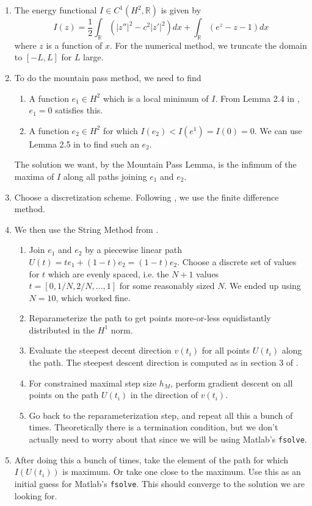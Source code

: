 \documentclass[12pt]{article}
\def\R{{\mathbb R}}
\begin{document}
\begin{enumerate}
	\item The energy functional $I \in C^1(H^2, \R)$ is given by
	\begin{equation}
	I(z) = \frac{1}{2} \int_\R (|z''|^2 - c^2 |z'|^2)dx 
	+ \int_\R (e^z - z - 1) dx
	\end{equation}
	where $z$ is a function of $x$. For the numerical method, we truncate the domain to $[-L, L]$ for $L$ large.
	\item To do the mountain pass method, we need to find
	\begin{enumerate}
		\item A function $e_1 \in H^2$ which is a local minimum of $I$. From Lemma 2.4 in \cite{Chen1997}, $e_1 = 0$ satisfies this.
		\item A function $e_2 \in H^2$ for which $I(e_2) < I(e^1) = I(0) = 0$. We can use Lemma 2.5 in \cite{Chen1997} to find such an $e_2$. 
	\end{enumerate} 
	The solution we want, by the Mountain Pass Lemma, is the infimum of the maxima of $I$ along all paths joining $e_1$ and $e_2$.
	\item Choose a discretization scheme. Following \cite{Chen1997}, we use the finite difference method.
	\item We then use the String Method from \cite{Chamard2011}.
	\begin{enumerate}
		\item Join $e_1$ and $e_2$ by a piecewise linear path $U(t) = t e_1 + (1-t) e_2 = (1-t)e_2$. Choose a discrete set of values for $t$ which are evenly spaced, i.e. the $N+1$ values $t = [0, 1/N, 2/N, ..., 1]$ for some reasonably sized $N$. We ended up using $N = 10$, which worked fine.
		\item Reparameterize the path to get points more-or-less equidistantly distributed in the $H^1$ norm.
		\item Evaluate the steepest decent direction $v(t_i)$ for all points $U(t_i)$ along the path. The steepest descent direction is computed as in section 3 of \cite{Chen1997}.
		\item For constrained maximal step size $h_M$, perform gradient descent on all points on the path $U(t_i)$ in the direction of $v(t_i)$.
		\item Go back to the reparameterization step, and repeat all this a bunch of times. Theoretically there is a termination condition, but we don't actually need to worry about that since we will be using Matlab's \texttt{fsolve}.
	\end{enumerate}
	\item After doing this a bunch of times, take the element of the path for which $I(U(t_i))$ is maximum. Or take one close to the maximum. Use this as an initial guess for Matlab's \texttt{fsolve}. This should converge to the solution we are looking for.
\end{enumerate}
\end{document}
